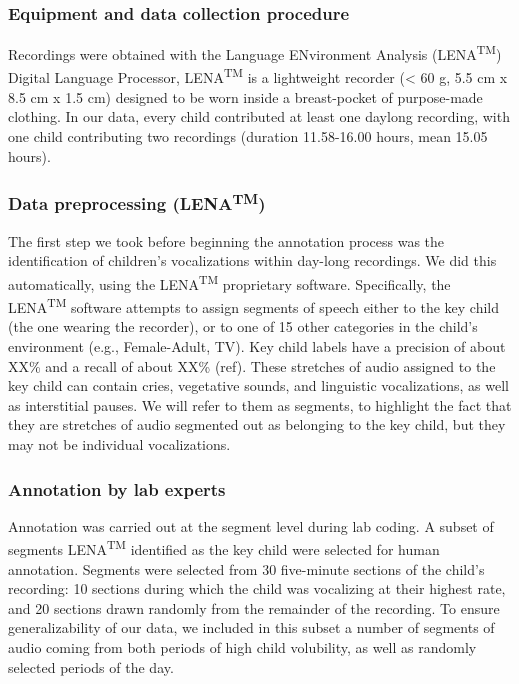 \documentclass[english,,man,floatsintext]{apa6}
\begin{document}
\hypertarget{equipment-and-data-collection-procedure}{%
\subsubsection{Equipment and data collection procedure}\label{equipment-and-data-collection-procedure}}

Recordings were obtained with the Language ENvironment Analysis (LENA\textsuperscript{TM}) Digital Language Processor, LENA\textsuperscript{TM} is a lightweight recorder (\textless{} 60 g, 5.5 cm x 8.5 cm x 1.5 cm) designed to be worn inside a breast-pocket of purpose-made clothing. In our data, every child contributed at least one daylong recording, with one child contributing two recordings (duration 11.58-16.00 hours, mean 15.05 hours).

\hypertarget{data-preprocessing-lenatm}{%
\subsubsection{\texorpdfstring{Data preprocessing (LENA\textsuperscript{TM})}{Data preprocessing (LENATM)}}\label{data-preprocessing-lenatm}}

The first step we took before beginning the annotation process was the identification of children's vocalizations within day-long recordings. We did this automatically, using the LENA\textsuperscript{TM} proprietary software. Specifically, the LENA\textsuperscript{TM} software attempts to assign segments of speech either to the key child (the one wearing the recorder), or to one of 15 other categories in the child's environment (e.g., Female-Adult, TV). Key child labels have a precision of about XX\% and a recall of about XX\% (ref). These stretches of audio assigned to the key child can contain cries, vegetative sounds, and linguistic vocalizations, as well as interstitial pauses. We will refer to them as segments, to highlight the fact that they are stretches of audio segmented out as belonging to the key child, but they may not be individual vocalizations.

\hypertarget{annotation-by-lab-experts}{%
\subsubsection{Annotation by lab experts}\label{annotation-by-lab-experts}}

Annotation was carried out at the segment level during lab coding. A subset of segments LENA\textsuperscript{TM} identified as the key child were selected for human annotation. Segments were selected from 30 five-minute sections of the child's recording: 10 sections during which the child was vocalizing at their highest rate, and 20 sections drawn randomly from the remainder of the recording. To ensure generalizability of our data, we included in this subset a number of segments of audio coming from both periods of high child volubility, as well as randomly selected periods of the day.
\end{document}
